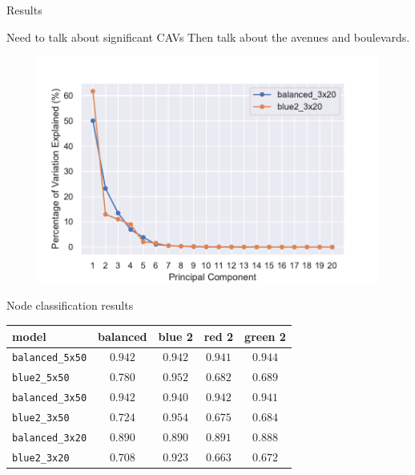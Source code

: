 \documentclass[final]{beamer}
\begin{document}
\begin{frame}[fragile]{}
\begin{textblock}{\colwidth}



\begin{paddedBlock}{Results}

\alert{Need to talk about significant CAVs}
Then talk about the avenues and boulevards.

\begin{figure}
    \centering
    \includegraphics[width=.8\textwidth]{img/scree_plot}
    \label{fig:big}
\end{figure}

\alert{Node classification results}

\begin{table}
\centering
\begin{tabular}{lcccc}
\hline

\textbf{model} &  \textbf{balanced} &   \textbf{blue 2} &    \textbf{red 2} &  \textbf{green 2} \\ \hline 
\texttt{balanced\_5x50} &    $0.942$ &  $0.942$ &  $0.941$ &  $0.944$ \\
\texttt{blue2\_5x50} &    $0.780$ &  $0.952$ &  $0.682$ &  $0.689$ \\
\texttt{balanced\_3x50} &    $0.942$ &  $0.940$ &  $0.942$ &  $0.941$ \\
\texttt{blue2\_3x50} &    $0.724$ &  $0.954$ &  $0.675$ &  $0.684$ \\
\texttt{balanced\_3x20} &    $0.890$ &  $0.890$ &  $0.891$ &  $0.888$ \\
\texttt{blue2\_3x20} &    $0.708$ &  $0.923$ &  $0.663$ &  $0.672$ \\
\hline


\end{tabular}
\end{table}
\end{paddedBlock}
\end{textblock}
\end{frame}
\end{document}
